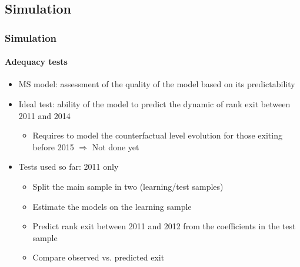 \documentclass[xcolor=table,ignorenonframetext,12pt]{beamer}
\newenvironment{choixmarges}[2]{\begin{list}{}{%
\setlength{\topsep}{0pt}%
\setlength{\leftmargin}{0pt}%
\setlength{\rightmargin}{0pt}%
\setlength{\listparindent}{\parindent}%
\setlength{\itemindent}{\parindent}%
\setlength{\parsep}{0pt plus 1pt}%
\addtolength{\leftmargin}{#1}%
\addtolength{\rightmargin}{#2}%
}\item }{\end{list}}
\begin{document}
\begin{frame}
\begin{choixmarges}{-0.5cm}{-0.5cm}
\end{choixmarges}

\end{frame}



\subsection{Simulation}

\begin{frame}
\frametitle{Simulation}
\framesubtitle{Adequacy tests}
\begin{choixmarges}{-0.5cm}{-0.5cm}


\begin{itemize}

\item MS model: assessment of the quality of the model based on its predictability
\vspace{0.2cm}

\item Ideal test: ability of the model to predict the dynamic of rank exit between 2011 and 2014
\begin{itemize}
\item Requires to model the counterfactual level evolution for those exiting before 2015
$\Rightarrow$ Not done yet
\end{itemize}
\vspace{0.2cm}

\item Tests used so far: 2011 only
\begin{itemize}
\item Split the main sample in two (learning/test samples)
\item Estimate the models on the learning sample 
\item Predict rank exit between 2011 and 2012 from the coefficients in the test sample
\item Compare observed vs. predicted exit
\end{itemize}

\end{itemize}
\end{choixmarges}

\end{frame}
\end{document}
